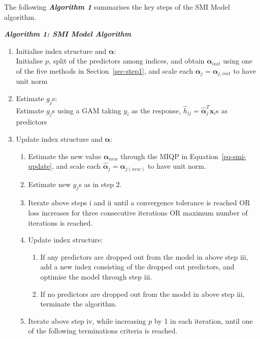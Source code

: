 \documentclass[11pt,a4paper,]{article}
\providecommand{\tightlist}{%
  \setlength{\itemsep}{0pt}\setlength{\parskip}{0pt}}
\begin{document}
The following \textbf{\emph{Algorithm 1}} summarises the key steps of
the SMI Model algorithm. \newline

\textbf{\emph{Algorithm 1: SMI Model Algorithm}}

\begin{enumerate}
\def\labelenumi{\arabic{enumi}.}
\item
  Initialise index structure and \(\bm{\alpha}\):\\
  Initialise \(p\), split of the predictors among indices, and obtain
  \(\bm{\alpha}_{init}\) using one of the five methods in
  Section~\ref{sec-step1}, and scale each
  \(\hat{\bm{\alpha}}_{j} = \bm{\alpha}_{j, init}\) to have unit norm
\item
  Estimate \(g_{j}\)s:\\
  Estimate \(g_{j}\)s using a GAM taking \(y_{i}\) as the response,
  \(\hat{h}_{ij} = \hat{\bm{\alpha}}_{j}^{T}\bm{x}_{i}\)s as predictors
\item
  Update index structure and \(\bm{\alpha}\):

  \begin{enumerate}
  \def\labelenumii{\roman{enumii}.}
  \tightlist
  \item
    Estimate the new value \(\bm{\alpha}_{new}\) through the MIQP in
    Equation~\ref{eq-smi-update}, and scale each
    \(\hat{\bm{\alpha}}_{j} = \bm{\alpha}_{j(new)}\) to have unit norm.
  \item
    Estimate new \(g_{j}\)s as in step 2.
  \item
    Iterate above steps i and ii until a convergence tolerance is
    reached OR loss increases for three consecutive iterations OR
    maximum number of iterations is reached.
  \item
    Update index structure:

    \begin{enumerate}
    \def\labelenumiii{\alph{enumiii}.}
    \tightlist
    \item
      If any predictors are dropped out from the model in above step
      iii, add a new index consisting of the dropped out predictors, and
      optimise the model through step iii.
    \item
      If no predictors are dropped out from the model in above step iii,
      terminate the algorithm.
    \end{enumerate}
  \item
    Iterate above step iv, while increasing \(p\) by 1 in each
    iteration, until one of the following terminations criteria is
    reached.


\end{enumerate}
\end{enumerate}
\end{document}
